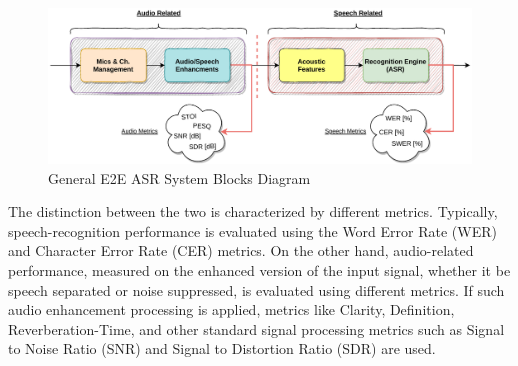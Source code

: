 \begin{figure}[H]
	\centering
	\includegraphics[width=\linewidth]{Introduction/images/asr_blocks}
	\caption{General E2E ASR System Blocks Diagram}\label{fig:asr_blocks_diagram}
\end{figure}
\vspace{-0.5cm}



The distinction between the two is characterized
by different metrics.
Typically, speech-recognition performance is evaluated
using the Word Error Rate (WER) and
Character Error Rate (CER) metrics.
On the other hand, audio-related performance,
measured on the enhanced version of the input signal,
whether it be speech separated or noise suppressed,
is evaluated using different metrics.
If such audio enhancement processing is applied,
metrics like Clarity\cite{c50}, Definition\cite{c50d50t50},
Reverberation-Time\cite{c50d50t50}, and other standard signal processing metrics
such as Signal to Noise Ratio (SNR) 
and Signal to Distortion Ratio (SDR) are used.


